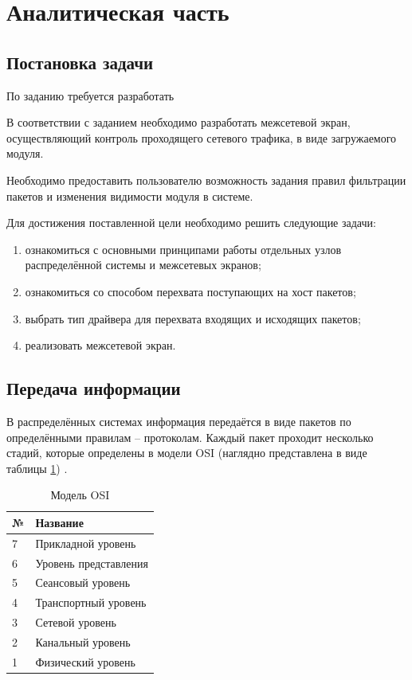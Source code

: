 \section{Аналитическая часть}

\subsection{Постановка задачи}\label{sec:task}
По заданию требуется разработать 


В соответствии с заданием необходимо разработать межсетевой экран, осуществляющий контроль проходящего сетевого трафика, в виде загружаемого модуля.

Необходимо предоставить пользователю возможность задания правил фильтрации пакетов и изменения видимости модуля в системе.

Для достижения поставленной цели необходимо решить следующие задачи:
\begin{enumerate}
	\item ознакомиться с основными принципами работы отдельных узлов распределённой системы и межсетевых экранов;
	
	\item ознакомиться со способом перехвата поступающих на хост пакетов;
	
	\item выбрать тип драйвера для перехвата входящих и исходящих пакетов;
	
	\item реализовать межсетевой экран. \newline
\end{enumerate}

\subsection{Передача информации}
В распределённых системах информация передаётся в виде пакетов по определёнными правилам -- протоколам. Каждый пакет проходит несколько стадий, которые определены в модели OSI (наглядно представлена в виде таблицы \ref{osi_table}) \cite{net}.

\begin{table}[h]
	\begin{center}
		\caption{Модель OSI}
		\label{osi_table}
		\begin{tabular}{| p{1cm} | p{7cm} |}
			\hline
			\textbf{№} 	& \textbf{Название} \\
			\hline
			7 				& Прикладной уровень\\ 
			\hline
			6 				& Уровень представления  \\ 
			\hline
			5 		& Сеансовый уровень \\ 
			\hline
			4 		& Транспортный уровень \\ 
			\hline
			3 		& Сетевой уровень \\ 
			\hline
			2 		& Канальный уровень \\ 
			\hline
			1 		& Физический уровень \\ 
			\hline
		\end{tabular}
	\end{center}
\end{table} 

